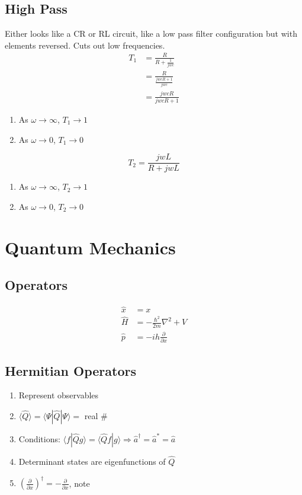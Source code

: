 \documentclass[10pt,letter]{article}
\begin{document}
\subsection{High Pass}
Either looks like a CR or RL circuit, like a low pass filter configuration but with elements reversed. Cuts out low frequencies.
\begin{align}
 T_1 &= \frac{R}{R + \frac{1}{jwc}}\\
 &= \frac{R}{\frac{jwcR + 1}{jwc}}\\
 &= \frac{jwcR}{jwcR + 1}
\end{align}
\begin{enumerate}
    \item As $\omega \rightarrow \infty$, $T_1 \rightarrow 1$
    \item As $\omega \rightarrow 0$, $T_1 \rightarrow 0$
\end{enumerate}
\begin{equation}
 T_2 = \frac{jwL}{R+jwL}
\end{equation}
\begin{enumerate}
    \item As $\omega \rightarrow \infty$, $T_2 \rightarrow 1$
    \item As $\omega \rightarrow 0$, $T_2 \rightarrow 0$
\end{enumerate}


\section{Quantum Mechanics}
\subsection{Operators}

\begin{align}
 \hat{x} &= x\\
 \hat{H} &= - \frac{\hbar^2}{2m}\nabla^2 + V\\
 \hat{p} &= -ih \frac{\partial}{\partial x}
\end{align}

\subsection{Hermitian Operators}
\begin{enumerate}
    \item Represent observables
    \item $\langle \hat{Q} \rangle = \langle \Psi | \hat{Q} | \Psi \rangle = $ real \#
    \item Conditions: $\langle f | \hat{Q} g \rangle = \langle \hat{Q}f|g \rangle \Rightarrow \hat{a}^\dagger = \hat{a}^* = \hat{a}$
    \item Determinant states are eigenfunctions of $\hat{Q}$
    \item $\left( \frac{\partial}{\partial x} \right)^\dagger = - \frac{\partial}{\partial x} $, note
\end{enumerate}
\end{document}
